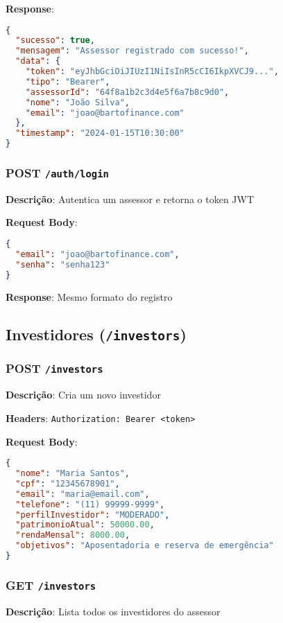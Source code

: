 \documentclass[12pt,a4paper]{article}
\begin{document}
\textbf{Response}:
\begin{lstlisting}[language=json]
{
  "sucesso": true,
  "mensagem": "Assessor registrado com sucesso!",
  "data": {
    "token": "eyJhbGciOiJIUzI1NiIsInR5cCI6IkpXVCJ9...",
    "tipo": "Bearer",
    "assessorId": "64f8a1b2c3d4e5f6a7b8c9d0",
    "nome": "João Silva",
    "email": "joao@bartofinance.com"
  },
  "timestamp": "2024-01-15T10:30:00"
}
\end{lstlisting}

\subsubsection{POST \texttt{/auth/login}}

\textbf{Descrição}: Autentica um assessor e retorna o token JWT

\textbf{Request Body}:
\begin{lstlisting}[language=json]
{
  "email": "joao@bartofinance.com",
  "senha": "senha123"
}
\end{lstlisting}

\textbf{Response}: Mesmo formato do registro

\subsection{Investidores (\texttt{/investors})}

\subsubsection{POST \texttt{/investors}}

\textbf{Descrição}: Cria um novo investidor

\textbf{Headers}: \texttt{Authorization: Bearer <token>}

\textbf{Request Body}:
\begin{lstlisting}[language=json]
{
  "nome": "Maria Santos",
  "cpf": "12345678901",
  "email": "maria@email.com",
  "telefone": "(11) 99999-9999",
  "perfilInvestidor": "MODERADO",
  "patrimonioAtual": 50000.00,
  "rendaMensal": 8000.00,
  "objetivos": "Aposentadoria e reserva de emergência"
}
\end{lstlisting}

\subsubsection{GET \texttt{/investors}}

\textbf{Descrição}: Lista todos os investidores do assessor
\end{document}
